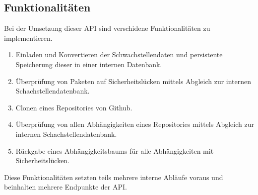 \subsection{Funktionalitäten} \label{sec:Funktionalitäten}
    Bei der Umsetzung dieser API sind verschidene Funktionalitäten zu implementieren.
    \begin{enumerate}
        \item Einladen und Konvertieren der Schwachstellendaten und persistente Speicherung dieser in einer internen Datenbank.
        \item Überprüfung von Paketen auf Sicherheitslücken mittels Abgleich zur internen Schachstellendatenbank.
        \item Clonen eines Repositories von Github.
        \item Überprüfung von allen Abhängigkeiten eines Repositories mittels Abgleich zur internen Schachstellendatenbank.
        \item Rückgabe eines Abhängigkeitsbaums für alle Abhängigkeiten mit Sicherheitslücken. 
    \end{enumerate}
    Diese Funktionalitäten setzten teils mehrere interne Abläufe voraus und beinhalten mehrere Endpunkte der API.
